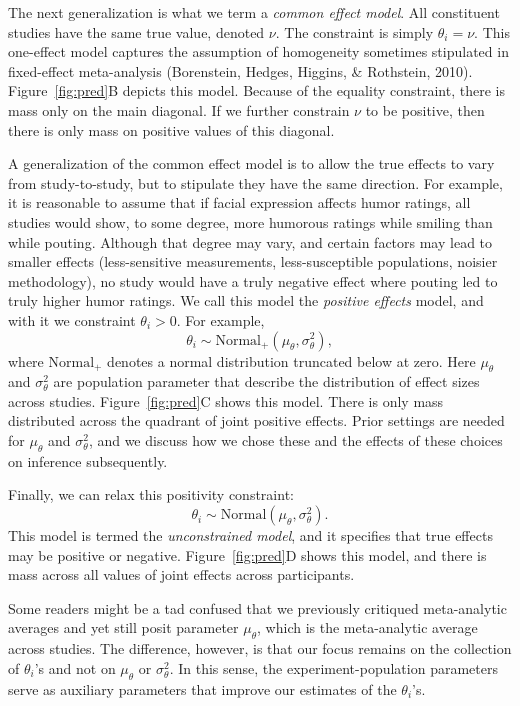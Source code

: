 \documentclass[english,man]{apa6}
\theoremstyle{definition}
\theoremstyle{definition}
\theoremstyle{remark}
\begin{document}
The next generalization is what we term a \emph{common effect model}.
All constituent studies have the same true value, denoted \(\nu\). The
constraint is simply \(\theta_i=\nu\). This one-effect model captures
the assumption of homogeneity sometimes stipulated in fixed-effect
meta-analysis (Borenstein, Hedges, Higgins, \& Rothstein, 2010).
Figure~\ref{fig:pred}B depicts this model. Because of the equality
constraint, there is mass only on the main diagonal. If we further
constrain \(\nu\) to be positive, then there is only mass on positive
values of this diagonal.

A generalization of the common effect model is to allow the true effects
to vary from study-to-study, but to stipulate they have the same
direction. For example, it is reasonable to assume that if facial
expression affects humor ratings, all studies would show, to some
degree, more humorous ratings while smiling than while pouting. Although
that degree may vary, and certain factors may lead to smaller effects
(less-sensitive measurements, less-susceptible populations, noisier
methodology), no study would have a truly negative effect where pouting
led to truly higher humor ratings. We call this model the \emph{positive
effects} model, and with it we constraint \(\theta_i>0\). For example,
\[
\theta_i \sim \mbox{Normal}_+(\mu_\theta,\sigma^2_\theta),
\] where \(\mbox{Normal}_+\) denotes a normal distribution truncated
below at zero. Here \(\mu_\theta\) and \(\sigma^2_\theta\) are
population parameter that describe the distribution of effect sizes
across studies. Figure~\ref{fig:pred}C shows this model. There is only
mass distributed across the quadrant of joint positive effects. Prior
settings are needed for \(\mu_\theta\) and \(\sigma^2_\theta\), and we
discuss how we chose these and the effects of these choices on inference
subsequently.

Finally, we can relax this positivity constraint: \[
\theta_i \sim \mbox{Normal}(\mu_\theta,\sigma^2_\theta).
\] This model is termed the \emph{unconstrained model}, and it specifies
that true effects may be positive or negative. Figure~\ref{fig:pred}D
shows this model, and there is mass across all values of joint effects
across participants.

Some readers might be a tad confused that we previously critiqued
meta-analytic averages and yet still posit parameter \(\mu_\theta\),
which is the meta-analytic average across studies. The difference,
however, is that our focus remains on the collection of \(\theta_i\)'s
and not on \(\mu_\theta\) or \(\sigma^2_\theta\). In this sense, the
experiment-population parameters serve as auxiliary parameters that
improve our estimates of the \(\theta_i\)'s.
\end{document}
